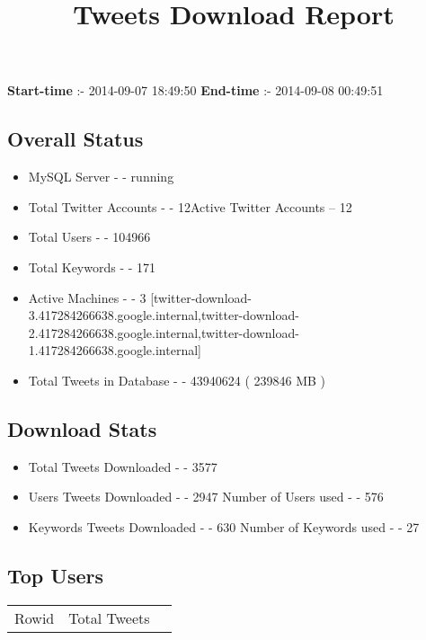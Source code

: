 \documentclass{article}\usepackage[T1]{fontenc}
\begin{document}
\title{\textbf{Tweets Download Report}}
               \date{}
                \maketitle
               \centerline{\textbf{Start-time} :- 2014-09-07 18:49:50 \hspace{40pt} \textbf{End-time} :- 2014-09-08 00:49:51}               \subsection*{Overall Status}                \begin{itemize}                \item MySQL Server - - running               \item Total Twitter Accounts - - 12\newline Active Twitter Accounts -- 12               \item Total Users - - 104966               \item Total Keywords - - 171               \item Active Machines - - 3 [twitter-download-3.417284266638.google.internal,twitter-download-2.417284266638.google.internal,twitter-download-1.417284266638.google.internal]               \item Total Tweets in Database - - 43940624 ( 239846 MB )               \end{itemize}               \subsection*{Download Stats}                \begin{itemize}                \item Total Tweets Downloaded - - 3577               \item Users Tweets Downloaded - - 2947 \newline Number of Users used - - 576               \item Keywords Tweets Downloaded - - 630 \newline Number of Keywords used - - 27              \end{itemize}              \subsection*{Top Users}\begin{tabular}{|c|c|c|}         \hline         Rowid & Total Tweets \\ 

\end{tabular}
\end{document}
